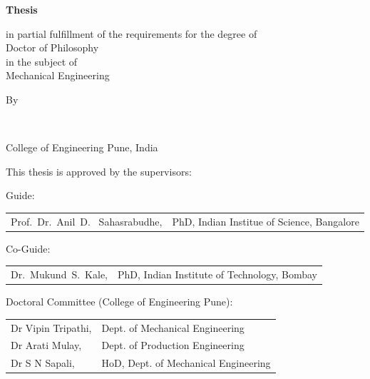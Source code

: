 \begin{titlepage}
\begin{center}
{\Large\titlefont\bfseries Thesis}

\bigskip
\bigskip

in partial fulfillment of the requirements for the degree of\\
Doctor of Philosophy\\
in the subject of \\
\bigskip
Mechanical Engineering



%
%

\bigskip
\bigskip

By

\bigskip
\bigskip

\makeatletter
{\Large\titlefont\bfseries\@firstname\ {\titleshape\@lastname}}
\makeatother

\bigskip
\bigskip

College of Engineering Pune, India


\vspace*{2\bigskipamount}

\end{center}

\clearpage
\thispagestyle{empty}

\noindent This thesis is approved by the supervisors:

\medskip
\noindent Guide:
\begin{tabular}{ll}
Prof.\ Dr.\ Anil\ D. \ Sahasrabudhe, & PhD, Indian Institue of Science, Bangalore\\
\end{tabular}

%
\noindent Co-Guide: 
\begin{tabular}{ll}
Dr.\ Mukund\ S.\ Kale, & PhD, Indian Institute of Technology, Bombay\\
\end{tabular}


\medskip
\noindent Doctoral Committee (College of Engineering Pune):

\medskip \noindent
\begin{tabular}{ll}
    Dr Vipin Tripathi,  & Dept. of Mechanical Engineering\\
    Dr Arati Mulay, & Dept. of Production Engineering\\
    Dr S N Sapali, & HoD, Dept. of Mechanical Engineering
\end{tabular}


\end{titlepage}
